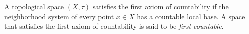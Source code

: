 \documentclass{article}
\begin{document}
A topological space $(X,\tau)$ satisfies the first axiom of countability
if the neighborhood system of every point $x\in X$ has a countable local base. A space that satisfies the first axiom of countability is said to be \emph{first-countable}.
\end{document}
